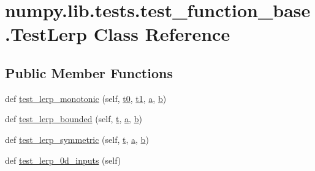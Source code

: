\hypertarget{classnumpy_1_1lib_1_1tests_1_1test__function__base_1_1TestLerp}{}\section{numpy.\+lib.\+tests.\+test\+\_\+function\+\_\+base.\+Test\+Lerp Class Reference}
\label{classnumpy_1_1lib_1_1tests_1_1test__function__base_1_1TestLerp}
\subsection*{Public Member Functions}
\begin{DoxyCompactItemize}
\item 
def \hyperlink{classnumpy_1_1lib_1_1tests_1_1test__function__base_1_1TestLerp_a0788710a2c746f59b2e0b27ad7ad0bd6}{test\+\_\+lerp\+\_\+monotonic} (self, \hyperlink{classnumpy_1_1lib_1_1tests_1_1test__function__base_1_1TestLerp_a8411b6619abc99ccbc5ad2196121dd52}{t0}, \hyperlink{classnumpy_1_1lib_1_1tests_1_1test__function__base_1_1TestLerp_aebb5433a000c1cdf987621b19a5cca7e}{t1}, \hyperlink{classnumpy_1_1lib_1_1tests_1_1test__function__base_1_1TestLerp_ab38ebddd047713bf89f36174038e89c0}{a}, \hyperlink{classnumpy_1_1lib_1_1tests_1_1test__function__base_1_1TestLerp_ad2247a2c16c46a05157936a2d502efcb}{b})
\item 
def \hyperlink{classnumpy_1_1lib_1_1tests_1_1test__function__base_1_1TestLerp_a213a20589e23f3e55e5931e8917150c6}{test\+\_\+lerp\+\_\+bounded} (self, \hyperlink{classnumpy_1_1lib_1_1tests_1_1test__function__base_1_1TestLerp_afc00202dfef407d298e53f76b300d2ad}{t}, \hyperlink{classnumpy_1_1lib_1_1tests_1_1test__function__base_1_1TestLerp_ab38ebddd047713bf89f36174038e89c0}{a}, \hyperlink{classnumpy_1_1lib_1_1tests_1_1test__function__base_1_1TestLerp_ad2247a2c16c46a05157936a2d502efcb}{b})
\item 
def \hyperlink{classnumpy_1_1lib_1_1tests_1_1test__function__base_1_1TestLerp_a55392412a2252c7b9771d6e99f019f76}{test\+\_\+lerp\+\_\+symmetric} (self, \hyperlink{classnumpy_1_1lib_1_1tests_1_1test__function__base_1_1TestLerp_afc00202dfef407d298e53f76b300d2ad}{t}, \hyperlink{classnumpy_1_1lib_1_1tests_1_1test__function__base_1_1TestLerp_ab38ebddd047713bf89f36174038e89c0}{a}, \hyperlink{classnumpy_1_1lib_1_1tests_1_1test__function__base_1_1TestLerp_ad2247a2c16c46a05157936a2d502efcb}{b})
\item 
def \hyperlink{classnumpy_1_1lib_1_1tests_1_1test__function__base_1_1TestLerp_a4ff02783a51cd8f6d0ce678152832d16}{test\+\_\+lerp\+\_\+0d\+\_\+inputs} (self)
\end{DoxyCompactItemize}
